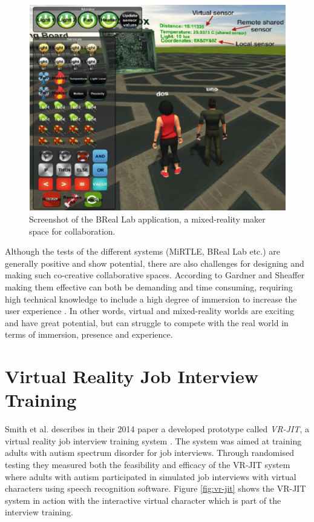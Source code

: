 \begin{figure}[!ht]
     \centering
     \includegraphics[width=.7\textwidth]{./fig/related_work/BReal.PNG}
     \captionsetup{width=0.6\linewidth}
     \caption{Screenshot of the BReal Lab application, a mixed-reality maker space for collaboration.}
     \label{fig:BReal}
 \end{figure}
 
 
 Although the tests of the different systems (MiRTLE, BReal Lab etc.) are generally positive and show  potential, there are also challenges for designing and making such co-creative collaborative spaces. According to Gardner and Sheaffer making them effective can both be demanding and time consuming, requiring high technical knowledge to include a high degree of immersion to increase the user experience \cite{gardner2017systems}. In other words, virtual and mixed-reality worlds are exciting and have great potential, but can struggle to compete with the real world in terms of immersion, presence and experience.          


\section{Virtual Reality Job Interview Training}
Smith et al. describes in their 2014 paper a developed prototype called \textit{VR-JIT}, a virtual reality job interview training system \cite{smith2014virtual}. The system was aimed at training adults with autism spectrum disorder for job interviews. Through randomised testing they measured both the feasibility and efficacy of the VR-JIT system where adults with autism participated in simulated job interviews with virtual characters using speech recognition software. Figure \ref{fig:vr-jit} shows the VR-JIT system in action with the interactive virtual character which is part of the interview training.   


